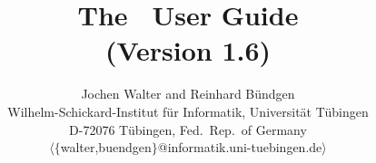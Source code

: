 \pagestyle{headings}
 


\setlength{\parindent}{0em}
\setlength{\parskip}{1ex}
 

\def\null{\makebox[0mm]{}}
\newtheorem{theorem}{Theorem}
\newtheorem{corollary}[theorem]{Corollary}
\newtheorem{proposition}[theorem]{Proposition}
\newtheorem{lemma}[theorem]{Lemma}
\newtheorem{specification}{Specification}
\newtheorem{definition}{Definition}
\newtheorem{xmpl}{Example}





\title{The \redux\  User Guide \\
        {\large (Version 1.6)} }
\author{Jochen Walter and Reinhard B\"{u}ndgen \\
        Wilhelm-Schickard-Institut f\"{u}r Informatik, 
        Universit\"{a}t T\"{u}bingen\\
        D-72076 T\"{u}bingen,
        Fed.\ Rep.\ of Germany\\
  {\small $\langle\{$walter,buendgen$\}$@informatik.uni-tuebingen.de$\rangle$}}



\maketitle
\tableofcontents
\newpage











\begin{appendix}







\end{appendix}

